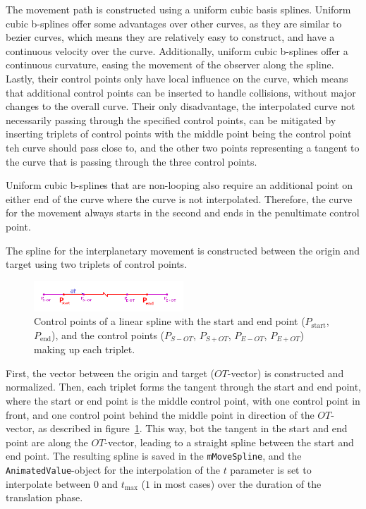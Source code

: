 The movement path is constructed using a uniform cubic basis splines.
Uniform cubic b-splines offer some advantages over other curves, as they are similar to bezier curves, which means
they are relatively easy to construct, and have a continuous velocity over the curve.
Additionally, uniform cubic b-splines offer a continuous curvature, easing the movement of the observer along the
spline.
Lastly, their control points only have local influence on the curve, which means that additional control points can
be inserted to handle collisions, without major changes to the overall curve.
Their only disadvantage, the interpolated curve not necessarily passing through the specified control points, can be
mitigated by inserting triplets of control points with the middle point being the control point teh curve should pass
close to, and the other two points representing a tangent to the curve that is passing through the three control points.

Uniform cubic b-splines that are non-looping also require an additional point on either end of the curve where the
curve is not interpolated.
Therefore, the curve for the movement always starts in the second and ends in the penultimate control point.

The spline for the interplanetary movement is constructed between the origin and target using two triplets of control
points.

\begin{figure}[h]
    \centering
    \includegraphics[width=0.5\textwidth]{content/4_3_autoNavigation/img/LinearSplinePoints}
    \caption{Control points of a linear spline with the start and end point ($P_{\mathrm{start}}$,
        $P_{\mathrm{end}}$), and the control points ($P_{S-OT}$, $P_{S+OT}$, $P_{E-OT}$, $P_{E+OT}$) making up each
        triplet.}
    \label{fig:linear-control-points}
\end{figure}

First, the vector between the origin and target ($OT$-vector) is constructed and normalized.
Then, each triplet forms the tangent through the start and end point, where the start or end point is the middle
control point, with one control point in front, and one control point behind the middle point in direction of the
$OT$-vector, as described in figure~\ref{fig:linear-control-points}.
This way, bot the tangent in the start and end point are along the $OT$-vector, leading to a straight spline between
the start and end point.
The resulting spline is saved in the \texttt{mMoveSpline}, and the \texttt{AnimatedValue}-object for the
interpolation of the $t$ parameter is set to interpolate between $0$ and $t_{\mathrm{max}}$ ($1$ in most cases) over the
duration of the translation phase.

